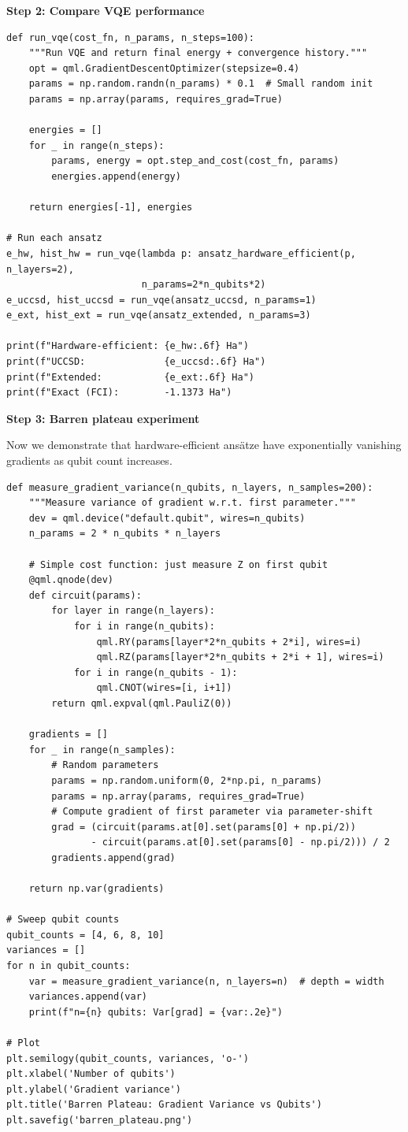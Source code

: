 \documentclass[11pt,a4paper]{article}
\begin{document}
\textbf{Step 2: Compare VQE performance}
\begin{lstlisting}
def run_vqe(cost_fn, n_params, n_steps=100):
    """Run VQE and return final energy + convergence history."""
    opt = qml.GradientDescentOptimizer(stepsize=0.4)
    params = np.random.randn(n_params) * 0.1  # Small random init
    params = np.array(params, requires_grad=True)
    
    energies = []
    for _ in range(n_steps):
        params, energy = opt.step_and_cost(cost_fn, params)
        energies.append(energy)
    
    return energies[-1], energies

# Run each ansatz
e_hw, hist_hw = run_vqe(lambda p: ansatz_hardware_efficient(p, n_layers=2), 
                        n_params=2*n_qubits*2)
e_uccsd, hist_uccsd = run_vqe(ansatz_uccsd, n_params=1)
e_ext, hist_ext = run_vqe(ansatz_extended, n_params=3)

print(f"Hardware-efficient: {e_hw:.6f} Ha")
print(f"UCCSD:              {e_uccsd:.6f} Ha")
print(f"Extended:           {e_ext:.6f} Ha")
print(f"Exact (FCI):        -1.1373 Ha")
\end{lstlisting}

\textbf{Step 3: Barren plateau experiment}

Now we demonstrate that hardware-efficient ansätze have exponentially vanishing gradients as qubit count increases.
\begin{lstlisting}
def measure_gradient_variance(n_qubits, n_layers, n_samples=200):
    """Measure variance of gradient w.r.t. first parameter."""
    dev = qml.device("default.qubit", wires=n_qubits)
    n_params = 2 * n_qubits * n_layers
    
    # Simple cost function: just measure Z on first qubit
    @qml.qnode(dev)
    def circuit(params):
        for layer in range(n_layers):
            for i in range(n_qubits):
                qml.RY(params[layer*2*n_qubits + 2*i], wires=i)
                qml.RZ(params[layer*2*n_qubits + 2*i + 1], wires=i)
            for i in range(n_qubits - 1):
                qml.CNOT(wires=[i, i+1])
        return qml.expval(qml.PauliZ(0))
    
    gradients = []
    for _ in range(n_samples):
        # Random parameters
        params = np.random.uniform(0, 2*np.pi, n_params)
        params = np.array(params, requires_grad=True)
        # Compute gradient of first parameter via parameter-shift
        grad = (circuit(params.at[0].set(params[0] + np.pi/2)) 
               - circuit(params.at[0].set(params[0] - np.pi/2))) / 2
        gradients.append(grad)
    
    return np.var(gradients)

# Sweep qubit counts
qubit_counts = [4, 6, 8, 10]
variances = []
for n in qubit_counts:
    var = measure_gradient_variance(n, n_layers=n)  # depth = width
    variances.append(var)
    print(f"n={n} qubits: Var[grad] = {var:.2e}")

# Plot
plt.semilogy(qubit_counts, variances, 'o-')
plt.xlabel('Number of qubits')
plt.ylabel('Gradient variance')
plt.title('Barren Plateau: Gradient Variance vs Qubits')
plt.savefig('barren_plateau.png')
\end{lstlisting}
\end{document}
